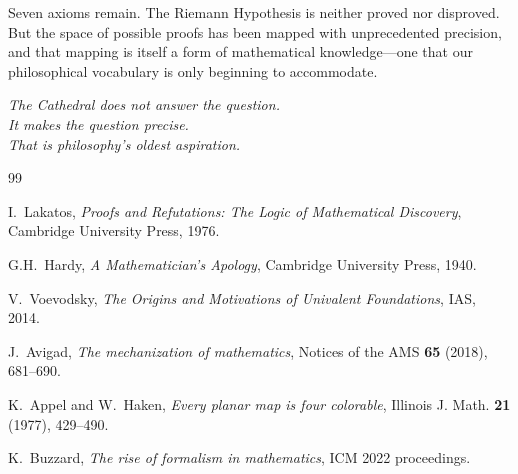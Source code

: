 \documentclass[11pt,a4paper]{article}
\begin{document}
Seven axioms remain. The Riemann Hypothesis is neither proved nor
disproved. But the space of possible proofs has been mapped with
unprecedented precision, and that mapping is itself a form of
mathematical knowledge---one that our philosophical vocabulary is
only beginning to accommodate.

\vspace{1cm}
\begin{flushright}
\emph{The Cathedral does not answer the question.}\\
\emph{It makes the question precise.}\\
\emph{That is philosophy's oldest aspiration.}
\end{flushright}

\vspace{1cm}

\begin{thebibliography}{99}

I.~Lakatos, \emph{Proofs and Refutations: The Logic of Mathematical
Discovery}, Cambridge University Press, 1976.

G.H.~Hardy, \emph{A Mathematician's Apology}, Cambridge University
Press, 1940.

V.~Voevodsky, \emph{The Origins and Motivations of Univalent
Foundations}, IAS, 2014.

J.~Avigad, \emph{The mechanization of mathematics}, Notices of the
AMS \textbf{65} (2018), 681--690.

K.~Appel and W.~Haken, \emph{Every planar map is four colorable},
Illinois J. Math. \textbf{21} (1977), 429--490.

K.~Buzzard, \emph{The rise of formalism in mathematics},
ICM 2022 proceedings.

\end{thebibliography}
\end{document}
